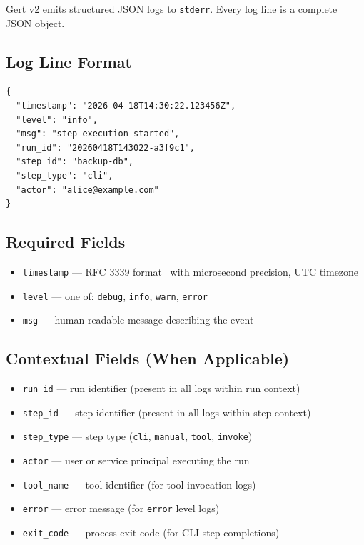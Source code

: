 Gert v2 emits structured JSON logs to \texttt{stderr}. Every log line is a complete JSON object.

\subsection{Log Line Format}

\begin{verbatim}
{
  "timestamp": "2026-04-18T14:30:22.123456Z",
  "level": "info",
  "msg": "step execution started",
  "run_id": "20260418T143022-a3f9c1",
  "step_id": "backup-db",
  "step_type": "cli",
  "actor": "alice@example.com"
}
\end{verbatim}

\subsection{Required Fields}

\begin{itemize}
  \item \texttt{timestamp} — RFC 3339 format~\cite{rfc3339} with microsecond precision, UTC timezone
  \item \texttt{level} — one of: \texttt{debug}, \texttt{info}, \texttt{warn}, \texttt{error}
  \item \texttt{msg} — human-readable message describing the event
\end{itemize}

\subsection{Contextual Fields (When Applicable)}

\begin{itemize}
  \item \texttt{run\_id} — run identifier (present in all logs within run context)
  \item \texttt{step\_id} — step identifier (present in all logs within step context)
  \item \texttt{step\_type} — step type (\texttt{cli}, \texttt{manual}, \texttt{tool}, \texttt{invoke})
  \item \texttt{actor} — user or service principal executing the run
  \item \texttt{tool\_name} — tool identifier (for tool invocation logs)
  \item \texttt{error} — error message (for \texttt{error} level logs)
  \item \texttt{exit\_code} — process exit code (for CLI step completions)
\end{itemize}

